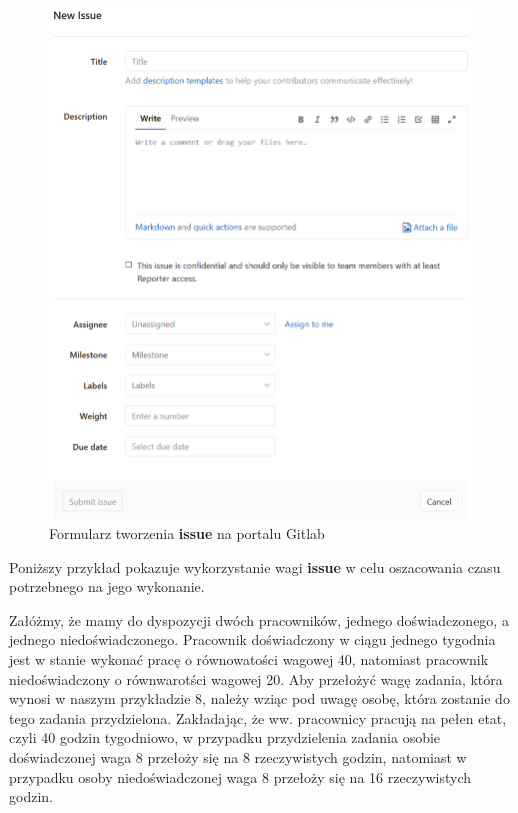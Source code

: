 \newpage

\begin{figure}[H]
\centering
\caption{Formularz tworzenia \textbf{issue} na portalu Gitlab}
\label{fig:newIssue}
\includegraphics[width=\textwidth]{res/png/newIssue}
\end{figure}

\newpage

Poniższy przykład pokazuje wykorzystanie wagi \textbf{issue} w celu oszacowania czasu potrzebnego na jego wykonanie.\par
Załóżmy, że mamy do dyspozycji dwóch pracowników, jednego doświadczonego, a jednego niedoświadczonego. Pracownik doświadczony w ciągu jednego tygodnia jest w stanie wykonać pracę o równowatości wagowej 40, natomiast pracownik niedoświadczony o równwarotści wagowej 20. Aby przełożyć wagę zadania, która wynosi w naszym przykładzie 8, należy wziąc pod uwagę osobę, która zostanie do tego zadania przydzielona. Zakładając, że ww. pracownicy pracują na pełen etat, czyli 40 godzin tygodniowo, w przypadku przydzielenia zadania osobie doświadczonej waga 8 przełoży się na 8 rzeczywistych godzin, natomiast w przypadku osoby niedoświadczonej waga 8 przełoży się na 16 rzeczywistych godzin. \par

